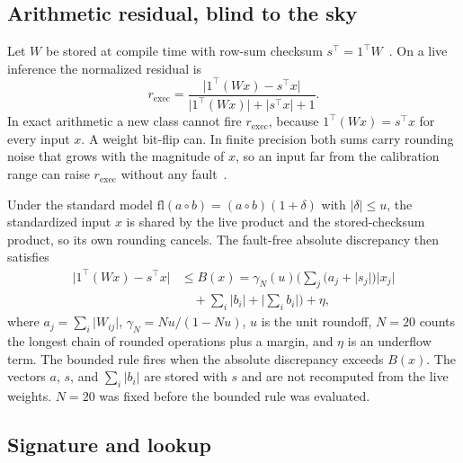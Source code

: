 \documentclass{ieeeaccess}
\begin{document}
\subsection{Arithmetic residual, blind to the sky}

Let $W$ be stored at compile time with row-sum checksum $s^\top=1^\top W$~\cite{zhao2021,huang1984}. On a live inference the normalized residual is
\begin{equation}
r_{\mathrm{exec}}=\frac{\lvert 1^\top(Wx)-s^\top x\rvert}{\lvert 1^\top(Wx)\rvert+\lvert s^\top x\rvert+1}.
\label{eq:exec}
\end{equation}
In exact arithmetic a new class cannot fire $r_{\mathrm{exec}}$, because $1^\top(Wx)=s^\top x$ for every input $x$. A weight bit-flip can. In finite precision both sums carry rounding noise that grows with the magnitude of $x$, so an input far from the calibration range can raise $r_{\mathrm{exec}}$ without any fault~\cite{higham2002}.

Under the standard model $\mathrm{fl}(a\circ b)=(a\circ b)(1+\delta)$ with $\lvert\delta\rvert\le u$, the standardized input $x$ is shared by the live product and the stored-checksum product, so its own rounding cancels. The fault-free absolute discrepancy then satisfies
\begin{equation}
\begin{split}
\lvert 1^\top(Wx)-s^\top x\rvert &\le B(x)=\gamma_N(u)\Big(\sum_j\big(a_j+\lvert s_j\rvert\big)\lvert x_j\rvert\\
&\quad+\sum_i\lvert b_i\rvert+\Big\lvert\sum_i b_i\Big\rvert\Big)+\eta,
\end{split}
\label{eq:bound}
\end{equation}
where $a_j=\sum_i\lvert W_{ij}\rvert$, $\gamma_N=Nu/(1-Nu)$, $u$ is the unit roundoff, $N=20$ counts the longest chain of rounded operations plus a margin, and $\eta$ is an underflow term. The bounded rule fires when the absolute discrepancy exceeds $B(x)$. The vectors $a$, $s$, and $\sum_i\lvert b_i\rvert$ are stored with $s$ and are not recomputed from the live weights. $N=20$ was fixed before the bounded rule was evaluated.

\subsection{Signature and lookup}
\end{document}
